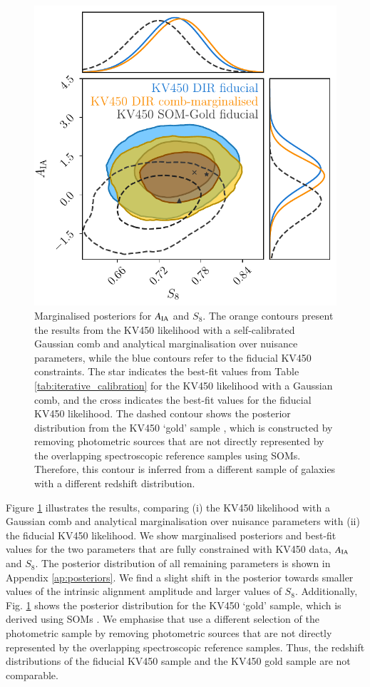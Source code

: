 \documentclass{aa}
\begin{document}
\begin{figure}
\centering
\includegraphics[width=\linewidth]{AIA_vs_S8}
\caption{Marginalised posteriors for $A_{\rm IA}$ and $S_8$. The orange contours present the results from the KV450 likelihood with a self-calibrated Gaussian comb and analytical marginalisation over nuisance parameters, while the blue contours refer to the fiducial KV450 constraints. The star indicates the best-fit values from Table \ref{tab:iterative_calibration} for the KV450 likelihood with a Gaussian comb, and the cross indicates the best-fit values for the fiducial KV450 likelihood. The dashed contour shows the posterior distribution from the KV450 `gold' sample \citep{wright_som_kv450}, which is constructed by removing photometric sources that are not directly represented by the overlapping spectroscopic reference samples using SOMs. Therefore, this contour is inferred from a different sample of galaxies with a different redshift distribution.}
\label{fig:AIA_vs_S8}
\end{figure}

Figure \ref{fig:AIA_vs_S8} illustrates the results, comparing (i) the KV450 likelihood with a Gaussian comb and analytical marginalisation over nuisance parameters with (ii) the fiducial KV450 likelihood. We show marginalised posteriors and best-fit values for the two parameters that are fully constrained with KV450 data, $A_{\rm IA}$ and $S_8$. The posterior distribution of all remaining parameters is shown in Appendix \ref{ap:posteriors}. We find a slight shift in the posterior towards smaller values of the intrinsic alignment amplitude and larger values of $S_8$. Additionally, Fig. \ref{fig:AIA_vs_S8} shows the posterior distribution for the KV450 `gold' sample, which is derived using SOMs \citep{wright_som_kv450}. We emphasise that \cite{wright_som_kv450} use a different selection of the photometric sample by removing photometric sources that are not directly represented by the overlapping spectroscopic reference samples. Thus, the redshift distributions of the fiducial KV450 sample and the KV450 gold sample are not comparable. 
\end{document}
